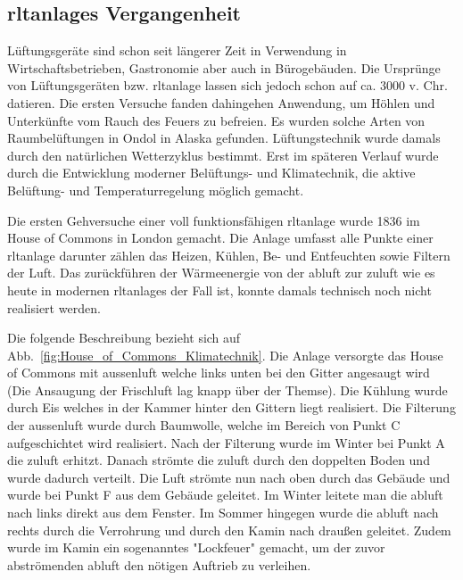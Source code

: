 \subsection{\Acp{rltanlage} Vergangenheit}
Lüftungsgeräte sind schon seit längerer Zeit in Verwendung \zB in Wirtschaftsbetrieben, Gastronomie aber auch in Bürogebäuden. Die Ursprünge von Lüftungsgeräten bzw. \ac{rltanlage} lassen sich jedoch schon auf ca. 3000 v. Chr. datieren.
Die ersten Versuche fanden dahingehen Anwendung, um Höhlen und Unterkünfte vom Rauch des Feuers zu befreien. Es wurden solche Arten von Raumbelüftungen \zB in Ondol in Alaska gefunden.
Lüftungstechnik wurde damals durch den natürlichen Wetterzyklus bestimmt. 
Erst im späteren Verlauf wurde durch die Entwicklung moderner Belüftungs- und Klimatechnik, die aktive Belüftung- und Temperaturregelung möglich gemacht.

Die ersten Gehversuche einer voll funktionsfähigen \acs{rltanlage} wurde 1836 im House of Commons in London gemacht. Die Anlage umfasst alle Punkte einer \acs{rltanlage} darunter zählen das Heizen, Kühlen, Be- und Entfeuchten sowie Filtern der Luft. Das zurückführen der Wärmeenergie von der \gls{abluft} zur \gls{zuluft} wie es heute in modernen \acp{rltanlage} der Fall ist, konnte damals technisch noch nicht realisiert werden.

Die folgende Beschreibung bezieht sich auf
Abb.~\ref{fig:House_of_Commons_Klimatechnik}.
Die Anlage versorgte das House of Commons mit \gls{aussenluft} welche links unten bei den Gitter angesaugt wird (Die Ansaugung der Frischluft lag knapp über der Themse). Die Kühlung wurde durch Eis welches in der Kammer hinter den Gittern liegt realisiert.
Die Filterung der \gls{aussenluft} wurde durch Baumwolle, welche im Bereich von Punkt C aufgeschichtet wird realisiert.
Nach der Filterung wurde im Winter bei Punkt A die \gls{zuluft} erhitzt. 
Danach strömte die \gls{zuluft} durch den doppelten Boden und wurde dadurch verteilt. Die Luft strömte nun nach oben durch das Gebäude und wurde bei Punkt F aus dem Gebäude geleitet. Im Winter leitete man die \gls{abluft} nach links direkt aus dem Fenster. Im Sommer hingegen wurde die \gls{abluft} nach rechts durch die Verrohrung und durch den Kamin  nach draußen geleitet. Zudem wurde im Kamin ein sogenanntes "Lockfeuer" gemacht, um der zuvor abströmenden \gls{abluft} den nötigen Auftrieb zu verleihen.
\cite[vgl.][]{Fitzner_Finke:2010}

